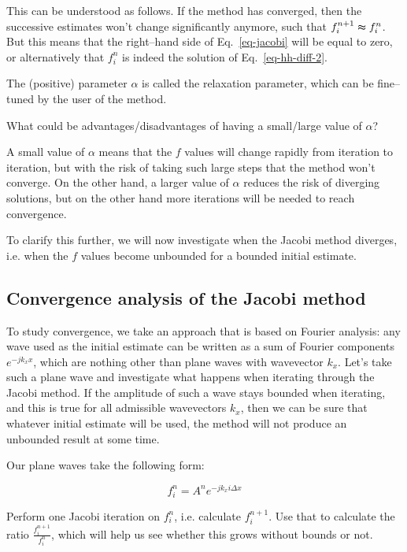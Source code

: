 This can be understood as follows. If the method has converged, then the successive estimates won't change significantly anymore, such that $ f_i^{n+1} \thickapprox f_i^n $. But this means that the right--hand side of Eq.~\ref{eq-jacobi} will be equal to zero, or alternatively that $f_i^n$ is indeed the solution of Eq.~\ref{eq-hh-diff-2}.

The (positive) parameter $\alpha$ is called the relaxation parameter, which can be fine--tuned by the user of the method.

\begin{cue}
What could be advantages/disadvantages of having a small/large value of $\alpha$? 
\end{cue}

A small value of $\alpha$ means that the $f$ values will change rapidly from iteration to iteration, but with the risk of taking such large steps that the method won't converge. On the other hand, a larger value of $\alpha$ reduces the risk of diverging solutions, but on the other hand more iterations will be needed to reach convergence.

To clarify this further, we will now investigate when the Jacobi method diverges, i.e. when the $f$ values become unbounded for a bounded initial estimate.

\subsection{Convergence analysis of the Jacobi method}

To study convergence, we take an approach that is based on Fourier analysis: any wave used as the initial estimate can be written as a sum of Fourier components $e^{-j k_x x}$, which are nothing other than plane waves with wavevector $k_x$. Let's take such a plane wave and investigate what happens when iterating through the Jacobi method. If the amplitude of such a wave stays bounded when iterating, and this is true for all admissible wavevectors $k_x$, then we can be sure that whatever initial estimate will be used, the method will not produce an unbounded result at some time.

Our plane waves take the following form:

\begin{equation}
f_i^n = A^n e^{-j k_x i \Delta x}
\end{equation} 

\begin{cue}
Perform one Jacobi iteration on $f_i^n$, i.e. calculate $f_i^{n+1}$. Use that to calculate the ratio $\frac{f_i^{n+1}}{f_i^{n}}$, which will help us see whether this grows without bounds or not.  
\end{cue}


